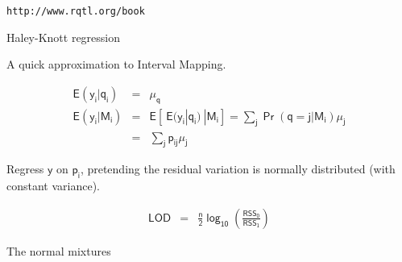 \documentclass[12pt]{article}
\newcommand{\headsize}{\fontsize{35}{35} \selectfont}
\newcommand{\smallsize}{\fontsize{25}{30} \selectfont}
\newcommand{\smallersize}{\fontsize{20}{25} \selectfont}
\newcommand{\smallestsize}{\fontsize{18}{22} \selectfont}
\newcommand{\lod}{\text{LOD}}
\newcommand{\rss}{\text{RSS}}
\begin{document}
\vfill

\smallestsize \color{mywhite} \verb|http://www.rqtl.org/book|

\newpage

\headsize \color{myyellow}
\hfill \begin{minipage}{5.75in}
\centering
Haley-Knott regression
\end{minipage}

\vspace{3cm}

\color{mywhite} \smallsize

\hspace*{0.5in}
A quick approximation to Interval Mapping.

\smallersize

\begin{eqnarray*}
\mathsf{E(y_i | q_i)} & = & \mathsf{ \mu_q } \\[24pt]
\mathsf{E(y_i | M_i)} & = & \mathsf{E[ \ E(y_i|q_i) \ | M_i]} 
 =  \mathsf{\textstyle{\sum_j \Pr(q=j|M_i) \mu_j}} \\[12pt]
& = & \mathsf{\textstyle{\sum_j p_{ij} \mu_j}}
\end{eqnarray*}

\vspace{1cm}

\hfill \begin{minipage}{10in}
\setlength{\rightskip}{0pt plus 1fil} %
{\color{mypink} Regress $\mathsf{y}$ on $\mathsf{p_i}$}, pretending the residual
variation is normally distributed (with constant variance).
\end{minipage}

\begin{eqnarray*}
\mathsf{\lod} & = & \mathsf{\frac{n}{2} \log_{10} \left( \frac{\rss_0}{\rss_1} \right)}
\end{eqnarray*}

\newpage

\headsize \color{myyellow}
\hfill \begin{minipage}{5.75in}
\centering
The normal mixtures
\end{minipage}

\vspace{15mm}
\end{document}
